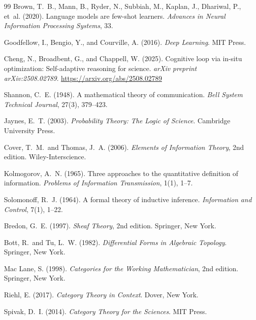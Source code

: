 \documentclass[11pt, oneside]{article}
\begin{document}
\begin{thebibliography}{99}
Brown, T.~B., Mann, B., Ryder, N., Subbiah, M., Kaplan, J., Dhariwal, P.,
  et~al. (2020).
\newblock Language models are few-shot learners.
\newblock \emph{Advances in Neural Information Processing Systems}, 33.

Goodfellow, I., Bengio, Y., and Courville, A. (2016).
\newblock \emph{Deep Learning}.
\newblock MIT Press.

Cheng, N., Broadbent, G., and Chappell, W. (2025).
\newblock Cognitive loop via in-situ optimization: Self-adaptive reasoning for science.
\newblock \emph{arXiv preprint arXiv:2508.02789}.
\newblock \url{https://arxiv.org/abs/2508.02789}

Shannon, C.~E. (1948).
\newblock A mathematical theory of communication.
\newblock \emph{Bell System Technical Journal}, 27(3), 379--423.

Jaynes, E.~T. (2003).
\newblock \emph{Probability Theory: The Logic of Science}.
\newblock Cambridge University Press.

Cover, T.~M.\ and Thomas, J.~A. (2006).
\newblock \emph{Elements of Information Theory}, 2nd edition.
\newblock Wiley-Interscience.

Kolmogorov, A.~N. (1965).
\newblock Three approaches to the quantitative definition of information.
\newblock \emph{Problems of Information Transmission}, 1(1), 1--7.

Solomonoff, R.~J. (1964).
\newblock A formal theory of inductive inference.
\newblock \emph{Information and Control}, 7(1), 1--22.

Bredon, G.~E. (1997).
\newblock \emph{Sheaf Theory}, 2nd edition.
\newblock Springer, New York.

Bott, R.\ and Tu, L.~W. (1982).
\newblock \emph{Differential Forms in Algebraic Topology}.
\newblock Springer, New York.

Mac Lane, S. (1998).
\newblock \emph{Categories for the Working Mathematician}, 2nd edition.
\newblock Springer, New York.

Riehl, E. (2017).
\newblock \emph{Category Theory in Context}.
\newblock Dover, New York.

Spivak, D.~I. (2014).
\newblock \emph{Category Theory for the Sciences}.
\newblock MIT Press.


\end{thebibliography}
\end{document}
